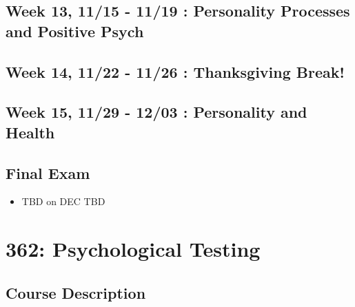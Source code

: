 \documentclass[
]{book}
\providecommand{\tightlist}{%
  \setlength{\itemsep}{0pt}\setlength{\parskip}{0pt}}
\begin{document}
\hypertarget{week-13-1115---1119-personality-processes-and-positive-psych}{%
\section*{Week 13, 11/15 - 11/19 : Personality Processes and Positive Psych}\label{week-13-1115---1119-personality-processes-and-positive-psych}}

\hypertarget{week-14-1122---1126-thanksgiving-break}{%
\section*{Week 14, 11/22 - 11/26 : Thanksgiving Break!}\label{week-14-1122---1126-thanksgiving-break}}

\hypertarget{week-15-1129---1203-personality-and-health}{%
\section*{Week 15, 11/29 - 12/03 : Personality and Health}\label{week-15-1129---1203-personality-and-health}}

\hypertarget{final-exam}{%
\section*{Final Exam}\label{final-exam}}

\begin{itemize}
\tightlist
\item
  TBD on DEC TBD
\end{itemize}

\hypertarget{psychological-testing}{%
\chapter*{362: Psychological Testing}\label{psychological-testing}}

\hypertarget{course-description-1}{%
\section{Course Description}\label{course-description-1}}
\end{document}
